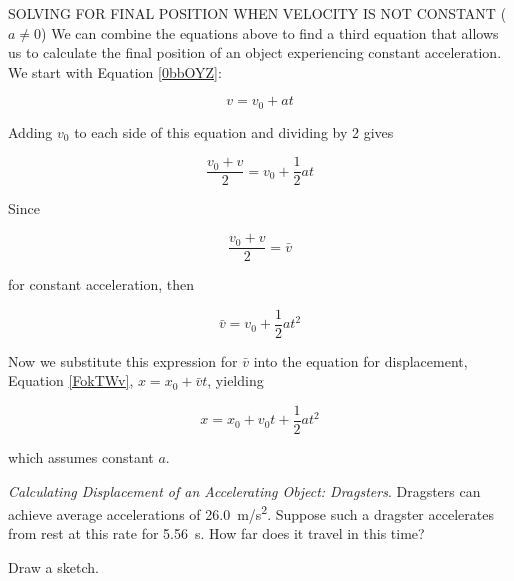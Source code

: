 \documentclass[../../main-ap-physics.tex]{subfiles}
\begin{document}
\begin{gradient}{SOLVING FOR FINAL POSITION WHEN VELOCITY IS NOT CONSTANT ($a \neq 0 $)}
We can combine the equations above to find a third equation that allows us to calculate the final position of an object experiencing constant acceleration. We start with Equation \eqref{0bbOYZ}:

\begin{equation*}
    v = v_0 + a t
\end{equation*}

Adding $v_0$ to each side of this equation and dividing by 2 gives

\begin{equation*}
    \frac{v_0 + v}{2} = v_0 + \frac{1}{2} a t
\end{equation*}

Since

\begin{equation*}
    \frac{v_0 + v}{2} = \bar{v}
\end{equation*}

for constant acceleration, then 

\begin{equation*}
    \bar{v} = v_0 + \frac{1}{2} a t^2 
\end{equation*}

Now we substitute this expression for $\bar{v}$ into the equation for displacement, Equation \eqref{FokTWv}, $x = x_0 + \bar{v} t$, yielding

\begin{equation} \label{03Tfzm}
    x = x_0 + v_0 t + \frac{1}{2} a t^2
\end{equation}

which assumes constant $a$.
\end{gradient}

\begin{example} \label{7ddBPA}
    \textit{Calculating Displacement of an Accelerating Object: Dragsters}. Dragsters can achieve average accelerations of \SI{26.0}{m/s^2}. Suppose such a dragster accelerates from rest at this rate for \SI{5.56}{s}. How far does it travel in this time?
\end{example}

\Solution Draw a sketch.

\begin{center}
\end{center}
\end{document}
